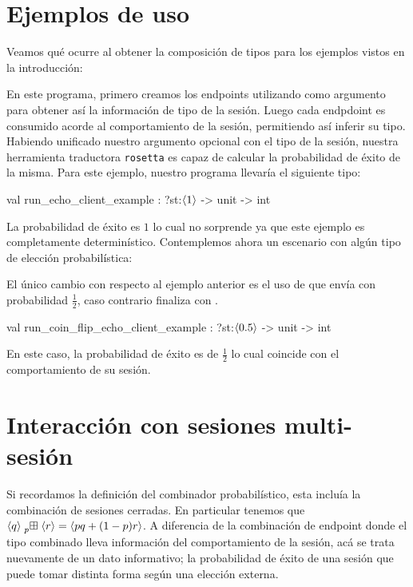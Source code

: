 \section{Ejemplos de uso}

Veamos qué ocurre al obtener la composición de tipos para los ejemplos vistos en la introducción:

\EchoClientClosedSession

En este programa, primero creamos los endpoints utilizando  como
argumento para obtener así la información de tipo de la sesión. Luego cada
endpdoint es consumido acorde al comportamiento de la sesión, permitiendo así
inferir su tipo. Habiendo unificado nuestro argumento opcional  con el
tipo de la sesión, nuestra herramienta traductora \texttt{rosetta} es capaz de
calcular la probabilidad de éxito de la misma. Para este ejemplo, nuestro programa
 llevaría el siguiente tipo:

\begin{table}[htb]
	\begin{OCamlD}
    val run_echo_client_example : ?st:$\ClosedSessionType[1]$ -> unit -> int
	\end{OCamlD}
\end{table}

La probabilidad de éxito es $1$ lo cual no sorprende ya que este ejemplo es
completamente determinístico. Contemplemos ahora un escenario con algún tipo de
elección probabilística:

\CoinFlipEchoClientClosedSession

El único cambio con respecto al ejemplo anterior es el uso de
 que envía con probabilidad $\frac{1}{2}$, caso
contrario finaliza con .

\begin{table}[htb]
	\begin{OCamlD}
 val run_coin_flip_echo_client_example : ?st:$\ClosedSessionType[0.5]$ -> unit -> int
	\end{OCamlD}
\end{table}

En este caso, la probabilidad de éxito es de $\frac{1}{2}$ lo cual coincide con
el comportamiento de su sesión.

\section{Interacción con sesiones multi-sesión}

Si recordamos la definición del combinador probabilístico, esta incluía la
combinación de sesiones cerradas. En particular tenemos que
$\csum{\ClosedSessionType[q]}{\ClosedSessionType[r]} =
\ClosedSessionType[pq+(1-p)r]$. A diferencia de la combinación de endpoint
donde el tipo combinado lleva información del comportamiento de la sesión, acá
se trata nuevamente de un dato informativo; la probabilidad de éxito de una
sesión que puede tomar distinta forma según una elección externa. 

